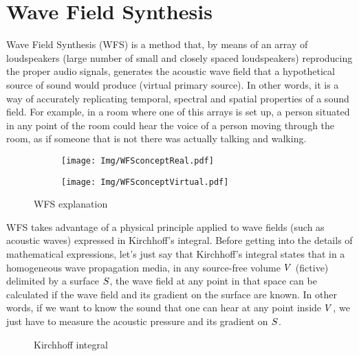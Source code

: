 \section{Wave Field Synthesis}
Wave Field Synthesis (WFS) is a method that, by means of an array of loudspeakers (large number of small and closely spaced loudspeakers) reproducing the proper audio signals, generates the acoustic wave field that a hypothetical source of sound would produce (virtual primary source). In other words, it is a way of accurately replicating temporal, spectral and spatial properties of a sound field. For example, in a room where one of this arrays is set up, a person situated in any point of the room could hear the voice of a person moving through the room, as if someone that is not there was actually talking and walking.

\begin{figure}[h]
	\centering
	\begin{subfigure}[c]{0.45\textwidth}
		\centering
		\texttt{[image: Img/WFSconceptReal.pdf]}
	\end{subfigure}
	\begin{subfigure}[c]{0.45\textwidth}
		\centering
		\texttt{[image: Img/WFSconceptVirtual.pdf]}
	\end{subfigure}
\caption[WFS explanation]{WFS explanation \cite{icons1}}
\label{WFSimageExplanation}
\end{figure}

WFS takes advantage of a physical principle applied to wave fields (such as acoustic waves) expressed in Kirchhoff's integral. Before getting into the details of mathematical expressions, let's just say that Kirchhoff's integral states that in a homogeneous wave propagation media, in any source-free volume $V$ (fictive) delimited by a surface $S$, the wave field at any point in that space can be calculated if the wave field and its gradient on the surface are known. In other words, if we want to know the sound that one can hear at any point inside $V$, we just have to measure the acoustic pressure and its gradient on $S$.

\begin{figure}[h]
		\centering
		\def\svgwidth{0.5\columnwidth}
		\graphicspath{{../TFM/Img/}}
		
	\caption[Kirchhoff integral]{Kirchhoff integral \cite{Brandenburg2009}}
	\label{KirchhoffScheme}
\end{figure}

